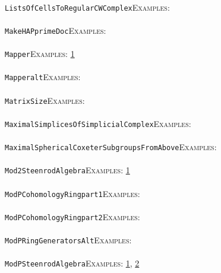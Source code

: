 \documentclass[a4paper,11pt]{report}
\begin{document}
{{ \\
 \texttt{ListsOfCellsToRegularCWComplex}{\nobreakspace}{\nobreakspace}{\nobreakspace}{\nobreakspace}\textsc{Examples:} \\
 \\
 \texttt{MakeHAPprimeDoc}{\nobreakspace}{\nobreakspace}{\nobreakspace}{\nobreakspace}\textsc{Examples:} \\
 \\
 \texttt{Mapper}{\nobreakspace}{\nobreakspace}{\nobreakspace}{\nobreakspace}\textsc{Examples:} \href{tutorial/chap4.html} {1}{\nobreakspace} \\
 \\
 \texttt{Mapper{\textunderscore}alt}{\nobreakspace}{\nobreakspace}{\nobreakspace}{\nobreakspace}\textsc{Examples:} \\
 \\
 \texttt{MatrixSize}{\nobreakspace}{\nobreakspace}{\nobreakspace}{\nobreakspace}\textsc{Examples:} \\
 \\
 \texttt{MaximalSimplicesOfSimplicialComplex}{\nobreakspace}{\nobreakspace}{\nobreakspace}{\nobreakspace}\textsc{Examples:} \\
 \\
 \texttt{MaximalSphericalCoxeterSubgroupsFromAbove}{\nobreakspace}{\nobreakspace}{\nobreakspace}{\nobreakspace}\textsc{Examples:} \\
 \\
 \texttt{Mod2SteenrodAlgebra}{\nobreakspace}{\nobreakspace}{\nobreakspace}{\nobreakspace}\textsc{Examples:} \href{../www/SideLinks/About/aboutModPRings.html} {1}{\nobreakspace} \\
 \\
 \texttt{ModPCohomologyRing{\textunderscore}part{\textunderscore}1}{\nobreakspace}{\nobreakspace}{\nobreakspace}{\nobreakspace}\textsc{Examples:} \\
 \\
 \texttt{ModPCohomologyRing{\textunderscore}part{\textunderscore}2}{\nobreakspace}{\nobreakspace}{\nobreakspace}{\nobreakspace}\textsc{Examples:} \\
 \\
 \texttt{ModPRingGeneratorsAlt}{\nobreakspace}{\nobreakspace}{\nobreakspace}{\nobreakspace}\textsc{Examples:} \\
 \\
 \texttt{ModPSteenrodAlgebra}{\nobreakspace}{\nobreakspace}{\nobreakspace}{\nobreakspace}\textsc{Examples:} \href{tutorial/chap7.html} {1}{\nobreakspace}, \href{../www/SideLinks/About/aboutModPRings.html} {2}{\nobreakspace} \\
}}
\end{document}
